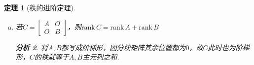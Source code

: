 \documentclass[11pt,UTF8]{ctexart}
\newtheorem{theorem}{定理}
\newtheorem*{analysis}{分析}
\def\dim{\mathrm{dim}\,}
\def\rank{\mathrm{rank}\,}
\def\row{\mathrm{Row}\,}
\begin{document}
\begin{theorem}[秩的进阶定理]
\begin{enumerate}[(a)]
	\begin{analysis}
	$1\degree$ 证明$A$一定有$m\times r$且秩为$r$的子矩阵$A_1$\\
	令$A_1$包含$A$的$r$个主元列，因这些列线性无关，故$A_1$即为所求.\\
	$2\degree$ 证明$A_1$一定有$r\times r$且可逆的子矩阵$A_2$\\
	$\rank A_1=\dim\row A_1=r$，令$A_2$包含$A_1$的$r$个线性无关的行，则$A_2$即为所求，且为方阵故可逆.
	\end{analysis}
	\item 若$C=\begin{bmatrix}A&O\\O&B\end{bmatrix}$，则$\rank C=\rank A+\rank B$
	\begin{analysis}
	将$A,B$都写成阶梯形，因分块矩阵其余位置都为$0$，故$C$此时也为阶梯形，$C$的秩就等于$A,B$主元列之和.
	\end{analysis}
\end{enumerate}
\end{theorem}
\end{document}
